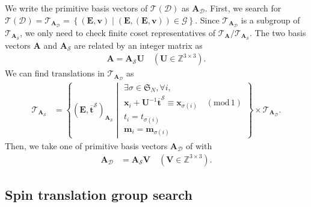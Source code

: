 \documentclass[a4paper, 11pt]{article}
\theoremstyle{definition}
\newcommand{\relmiddle}[1]{\mathrel{}\middle#1\mathrel{}}
\newcommand{\set}[2]{\left\{ #1 \relmiddle| #2 \right\}}
\begin{document}
We write the primitive basis vectors of $\mathcal{T}(\mathcal{D})$ as $\bm{A}_{\mathcal{D}}$.
First, we search for $\mathcal{T}(\mathcal{D}) = \mathcal{T}_{\bm{A}_{\mathcal{D}}} = \set{ (\bm{E}, \bm{v}) }{ (\bm{E}, (\bm{E}, \bm{v})) \in \mathcal{G} }$.
Since $\mathcal{T}_{\bm{A}_{\mathcal{D}}}$ is a subgroup of $\mathcal{T}_{\bm{A}_{\mathcal{S}}}$, we only need to check finite coset representatives of $\mathcal{T}_{\bm{A}} / \mathcal{T}_{\bm{A}_{\mathcal{S}}}$.
The two basis vectors $\bm{A}$ and $\bm{A}_{\mathcal{S}}$ are related by an integer matrix as
\begin{align}
  \bm{A} = \bm{A}_{\mathcal{S}} \bm{U} \quad (\bm{U} \in \mathbb{Z}^{3 \times 3}).
\end{align}
We can find translations in $\mathcal{T}_{\bm{A}_{\mathcal{D}}}$ as
\begin{align}
  \mathcal{T}_{\bm{A}_{\mathcal{S}}}
    &= \set{
      \left( \bm{E}, \overline{ \bm{t} }^{\mathcal{S}} \right)_{ \bm{A}_{\mathcal{S}} }
      }{
        \begin{array}{l}
          \exists \sigma \in \mathfrak{S}_{N}, \forall i, \\
          \bm{x}_{i} + \bm{U}^{-1} \overline{ \bm{t} }^{\mathcal{S}} \equiv \bm{x}_{\sigma(i)} \quad (\mathrm{mod}\, 1) \\
          t_{i} = t_{\sigma(i)} \\
          \bm{m}_{i} = \bm{m}_{\sigma(i)}
        \end{array}
      }
      \times \mathcal{T}_{\bm{A}_{\mathcal{D}}}.
\end{align}
Then, we take one of primitive basis vectors $\bm{A}_{\mathcal{D}}$ of with
\begin{align}
  \bm{A}_{\mathcal{D}}
    &= \bm{A}_{\mathcal{S}} \bm{V} \quad (\bm{V} \in \mathbb{Z}^{3 \times 3}).
\end{align}

\subsection{Spin translation group search}
\end{document}
